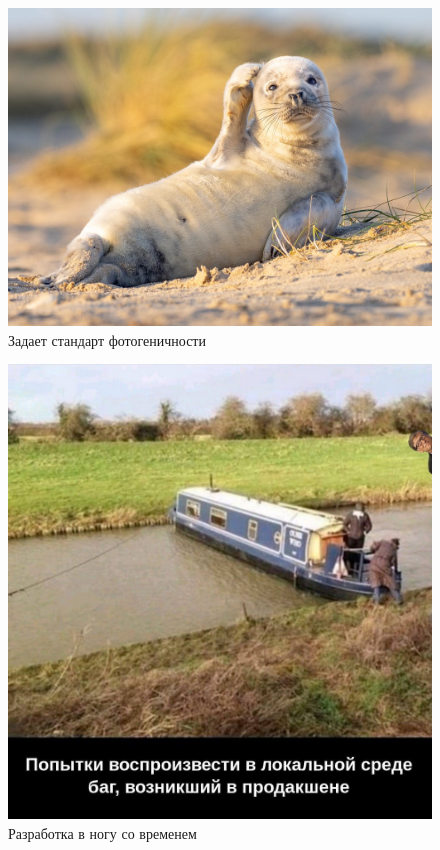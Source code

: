 \documentclass[a4paper, 12pt]{article}
\begin{document}
\begin{figure}[b]
  \centering
  \includegraphics[scale=0.20]{image_2}
  \caption{Задает стандарт фотогеничности}
\end{figure}
\lipsum[1-3]
\begin{figure}[h]
  \centering
  \includegraphics[scale=0.20]{image_3}
  \caption{Разработка в ногу со временем}
\end{figure}
\end{document}
